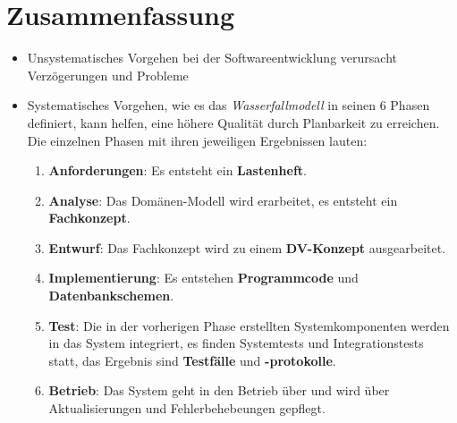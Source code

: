 \section{Zusammenfassung}

\begin{itemize}
    \item Unsystematisches Vorgehen bei der Softwareentwicklung verursacht Verzögerungen und Probleme
    \item Systematisches Vorgehen, wie es das \textit{Wasserfallmodell} in seinen 6 Phasen definiert, kann helfen, eine höhere Qualität
    durch Planbarkeit zu erreichen.\\
    Die einzelnen Phasen mit ihren jeweiligen Ergebnissen lauten:
    \begin{enumerate}
        \item \textbf{Anforderungen}: Es entsteht ein \textbf{Lastenheft}.
        \item \textbf{Analyse}: Das Domänen-Modell wird erarbeitet, es entsteht ein \textbf{Fachkonzept}.
        \item \textbf{Entwurf}: Das Fachkonzept wird zu einem \textbf{DV-Konzept} ausgearbeitet.
        \item \textbf{Implementierung}: Es entstehen \textbf{Programmcode} und \textbf{Datenbankschemen}.
        \item \textbf{Test}: Die in der vorherigen Phase erstellten Systemkomponenten werden in das System integriert, es finden Systemtests und Integrationstests statt, das Ergebnis sind \textbf{Testfälle} und \textbf{-protokolle}.
        \item \textbf{Betrieb}: Das System geht in den Betrieb über und wird über Aktualisierungen und Fehlerbehebeungen gepflegt.

    \end{enumerate}

\end{itemize}